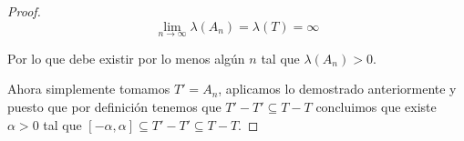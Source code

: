 \documentclass[letter,twoside,12pt]{article}
\numberwithin{equation}{section}
\begin{document}
\begin{proof}
\begin{equation}
\lim_{n \to \infty}\lambda(A_n) = \lambda(T) = \infty 
\end{equation}

Por lo que debe existir por lo menos algún $n$ tal que $\lambda(A_n)>0$.

Ahora simplemente tomamos $T' = A_n$, aplicamos lo demostrado anteriormente y puesto que por definición tenemos que $T'-T' \subseteq T-T$ concluimos que existe $\alpha > 0$ tal que $[-\alpha, \alpha] \subseteq T'-T' \subseteq T-T $.
\end{proof}



\end{document}
